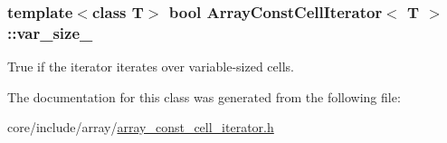 \subsubsection[{var\+\_\+size\+\_\+}]{\setlength{\rightskip}{0pt plus 5cm}template$<$class T$>$ bool {\bf Array\+Const\+Cell\+Iterator}$<$ T $>$\+::var\+\_\+size\+\_\+\hspace{0.3cm}{\ttfamily [private]}}\label{classArrayConstCellIterator_a3c926b368ef8096ebb528b4431b73505}
True if the iterator iterates over variable-\/sized cells. 

The documentation for this class was generated from the following file\+:\begin{DoxyCompactItemize}
\item 
core/include/array/\hyperlink{array__const__cell__iterator_8h}{array\+\_\+const\+\_\+cell\+\_\+iterator.\+h}\end{DoxyCompactItemize}

